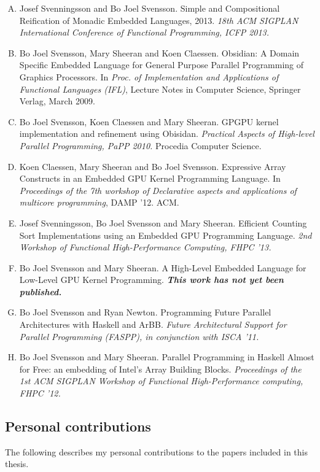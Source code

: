 \documentclass[a4paper]{book}
\begin{document}
\begin{enumerate}[A.] 
\item Josef Svenningsson and Bo Joel Svensson. Simple and Compositional Reification of Monadic Embedded Languages, 2013. \emph{18th ACM SIGPLAN International Conference of Functional Programming, ICFP 2013.}
\item Bo Joel Svensson, Mary Sheeran and Koen Claessen. Obsidian: A Domain Specific Embedded Language for General Purpose Parallel Programming of Graphics Processors. In \emph{Proc. of Implementation and Applications of Functional Languages (IFL)}, Lecture Notes in Computer Science, Springer Verlag, March 2009.
\item Bo Joel Svensson, Koen Claessen and Mary Sheeran. GPGPU kernel implementation and refinement using Obisidan. \emph{Practical Aspects of High-level Parallel Programming, PaPP 2010.} Procedia Computer Science.
\item Koen Claessen, Mary Sheeran and Bo Joel Svensson. Expressive Array Constructs in an Embedded GPU Kernel Programming Language. In \emph{Proceedings of the 7th workshop of Declarative aspects and applications of multicore programming}, DAMP '12. ACM. 
\item Josef Svenningsson, Bo Joel Svensson and Mary Sheeran. Efficient Counting Sort Implementations using an Embedded GPU Programming Language. \emph{2nd Workshop of Functional High-Performance Computing, FHPC '13.}
\item Bo Joel Svensson and Mary Sheeran. A High-Level Embedded Language for Low-Level GPU Kernel Programming. {\bf\emph{This work has not yet been published.}} 
\item Bo Joel Svensson and Ryan Newton. Programming Future Parallel Architectures with Haskell and ArBB. \emph{Future Architectural Support for Parallel Programming (FASPP), in conjunction with ISCA '11.}
\item Bo Joel Svensson and Mary Sheeran. Parallel Programming in Haskell Almost for Free: an embedding of Intel's Array Building Blocks. \emph{Proceedings of the 1st ACM SIGPLAN Workshop of Functional High-Performance computing, FHPC '12.}
\end{enumerate} 

\clearpage
\subsection*{Personal contributions} 

The following describes my personal contributions to the papers included 
in this thesis. 
\end{document}
